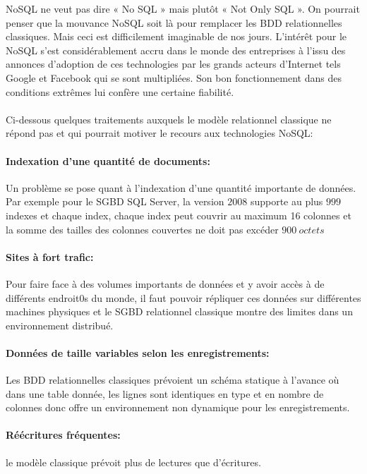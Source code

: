 \textsf{NoSQL} ne veut pas dire « \textsf{No SQL} » mais plutôt «
  \textsf{Not Only SQL} ». On pourrait penser que la mouvance
\textsf{NoSQL} soit là pour remplacer les \textsf{BDD}
relationnelles classiques. Mais ceci est difficilement imaginable de
nos jours. L’intérêt pour le \textsf{NoSQL} s'est considérablement
accru dans le monde des entreprises à l'issu des annonces d’adoption 
de ces technologies par les grands acteurs d'\textsf{Internet} tels 
\textsf{Google} et \textsf{Facebook} qui se sont multipliées. Son bon 
fonctionnement dans des conditions extrêmes lui confère une certaine fiabilité.
\\
\\
Ci-dessous quelques traitements auxquels le modèle relationnel classique ne répond pas
et qui pourrait motiver le recours aux technologies \textsf{NoSQL}:

\paragraph{Indexation d'une quantité de documents:}
Un problème se pose quant à l'indexation d'une quantité importante de données. Par exemple pour le \textsf{SGBD} \textsf{SQL Server}, la version $2008$ supporte au plus $999$ indexes et chaque index, chaque index peut couvrir au maximum 16 colonnes et la somme des tailles des colonnes couvertes ne doit pas excéder $900\ octets$\cite{SQLserver} 

\paragraph{Sites à fort trafic:} Pour faire face à des volumes importants de données et y avoir accès à de différents endroit0s du monde, il faut pouvoir répliquer ces données sur différentes machines physiques et le \textsf{SGBD} relationnel classique montre des limites dans un environnement distribué. 

\paragraph{Données de taille variables selon les enregistrements:} Les \textsf{BDD} relationnelles classiques prévoient un schéma statique à l'avance où dans une table donnée, les lignes sont identiques en type et en nombre de colonnes donc offre un environnement non dynamique pour les enregistrements.

\paragraph{Réécritures fréquentes:} le modèle classique prévoit plus de lectures que d'écritures.

